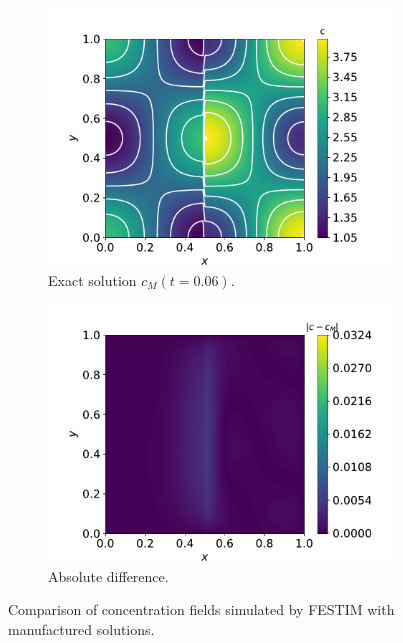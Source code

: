 \begin{figure}
\begin{subfigure}{0.33\linewidth}
        \includegraphics[width=\linewidth]{Figures/Chapter3/monoblocks/interface_condition/u_exact_t0.06.pdf}
        \caption{Exact solution $c_M(t=0.06)$.}
    \end{subfigure}%
    \begin{subfigure}{0.33\linewidth}
        \centering
        \includegraphics[width=\linewidth]{Figures/Chapter3/monoblocks/interface_condition/diff_t0.06.pdf}
        \caption{Absolute difference.}
    \end{subfigure}
    \caption{Comparison of concentration fields simulated by FESTIM with manufactured solutions.}
\end{figure}



